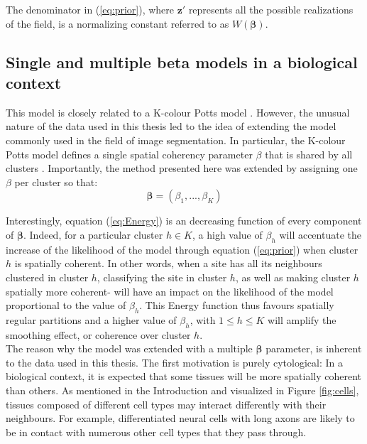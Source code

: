 The denominator in (\ref{eq:prior}), where $\boldsymbol{z'}$ represents all the possible realizations of the field, is a normalizing constant referred to as $W(\boldsymbol{\beta})$.\\

	\subsection{Single and multiple beta models in a biological context}
This model is closely related to a K-colour Potts model \cite{Wu82}. However, the unusual nature of the data used in this thesis led to the idea of extending the model commonly used in the field of image segmentation. In particular, the K-colour Potts model defines a single spatial coherency parameter $\beta$ that is shared by all clusters \cite{subudhi14,zhang14}. Importantly, the method presented here was extended by assigning one $\beta$ per cluster so that:
\begin{equation*}
\label{eq:beta}
\boldsymbol{\beta} = (\beta_{1},...,\beta_{K})
\end{equation*}

 Interestingly, equation (\ref{eq:Energy}) is an decreasing function of every component of $\boldsymbol{\beta}$. Indeed, for a particular cluster $h \in K$, a high value of $\beta_h$ will accentuate the increase of the likelihood of the model through equation (\ref{eq:prior}) when cluster $h$ is spatially coherent. In other words, when a site has all its neighbours clustered in cluster $h$, classifying the site in cluster $h$, as well as making cluster $h$ spatially more coherent- will have an impact on the likelihood of the model proportional to the value of $\beta_h$. This Energy function thus favours spatially regular partitions and a higher value of $\beta_h$, with $1 \leq h \leq K $ will amplify the smoothing effect, or coherence over cluster $h$.\\
 
 The reason why the model was extended with a multiple $\boldsymbol{\beta}$ parameter, is inherent to the data used in this thesis. The first motivation is purely cytological: In a biological context, it is expected that some tissues will be more spatially coherent than others. As mentioned in the Introduction and visualized in Figure \ref{fig:cells}, tissues composed of different cell types may interact differently with their neighbours. For example, differentiated neural cells with long axons are likely to be in contact with numerous other cell types that they pass through.\\
 
